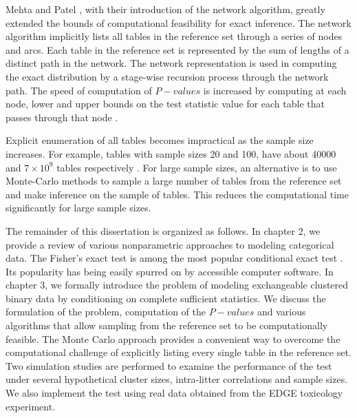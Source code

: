 \documentclass[12pt,oneside]{report}
\theoremstyle{definition}
\theoremstyle{mystyle}
\begin{document}
Mehta and Patel \cite{Mehta1983}, with their introduction of the network algorithm, greatly extended the bounds of computational feasibility for exact inference. The network algorithm implicitly lists all tables in the reference set through a series of nodes and arcs. Each table in the reference set is represented by the sum of lengths of a distinct path in the network. The network representation is used in computing the exact distribution by a stage-wise recursion process through the network path. The speed of computation of $P-values$ is increased by computing at each node, lower and upper bounds on the test statistic  value for each table that passes through that node \cite{Agresti1992}.


Explicit enumeration of all tables becomes impractical as the sample size increases. For example, tables with sample sizes 20 and 100, have about 40000 and $7\times 10^9$ tables respectively \cite{Agresti2001}. For large sample sizes, an alternative is to use  Monte-Carlo methods to sample a large number of tables from the reference set and make inference on the sample of tables. This reduces the computational time significantly for large sample sizes. 


The remainder of this dissertation is organized  as follows.
In chapter 2,  we provide a review of various  nonparametric approaches to modeling categorical data.
  The Fisher's exact test is among the most popular conditional exact test \cite{Fisher}. Its popularity has being easily spurred on  by  accessible computer software.
In chapter 3, we formally introduce  the problem of modeling exchangeable clustered binary data by conditioning on complete sufficient statistics. We discuss  the formulation  of the problem,  computation of the $P-values$  and various algorithms that allow  sampling from the reference set to be computationally feasible. The Monte Carlo approach provides a convenient way to overcome the computational challenge of explicitly listing  every single  table in the reference set. Two simulation studies are performed to examine the performance of the test under several hypothetical cluster sizes, intra-litter correlations and sample sizes. We also implement the test using real data obtained from the EDGE toxicology experiment. 
\end{document}
